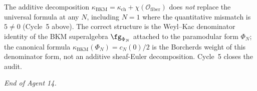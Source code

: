 The additive decomposition
$\kappa_{\mathrm{BKM}} = \kappa_{\mathrm{ch}} +
\chi(\mathcal{O}_{\mathrm{fiber}})$ does \emph{not} replace
the universal formula at any $N$, including $N = 1$ where the
quantitative mismatch is $5 \neq 0$ (Cycle~5 above). The
correct structure is the Weyl--Kac denominator identity of the
BKM superalgebra $\fg_{\Phi_N}$ attached to the paramodular form
$\Phi_N$; the canonical formula
$\kappa_{\mathrm{BKM}}(\Phi_N) = c_N(0)/2$ is the Borcherds
weight of this denominator form, not an additive sheaf-Euler
decomposition. Cycle~5 closes the audit.

\emph{End of Agent 14.}

